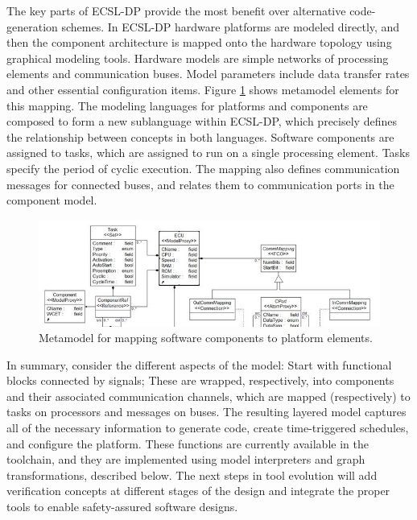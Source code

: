 The key parts of ECSL-DP provide the most benefit over alternative code-generation schemes.  In ECSL-DP hardware platforms are modeled directly, and then the component architecture is mapped onto the hardware topology using graphical modeling tools.   Hardware models are simple networks of processing elements and communication buses.  Model parameters include data transfer rates and other essential configuration items.  Figure \ref{fig:MappingMeta} shows metamodel elements for this mapping.  The modeling languages for platforms and components are composed to form a new sublanguage within ECSL-DP, which precisely defines the relationship between concepts in both languages.  Software components are assigned to tasks, which are assigned to run on a single processing element.  Tasks specify the period of cyclic execution.  The mapping also defines communication messages for connected buses, and relates them to communication ports in the component model.

\begin{figure}[h]
\begin{center}
   \includegraphics[width=0.9\columnwidth]{mapping_meta}
   \caption{Metamodel for mapping software components to platform elements.}
   \label{fig:MappingMeta}
\end{center}
\end{figure}
     
     In summary, consider the different aspects of the model:  Start with functional blocks connected by signals; These are wrapped, respectively, into components and their associated communication channels, which are mapped (respectively) to tasks on processors and messages on buses.  The resulting layered model captures all of the necessary information to generate code, create time-triggered schedules, and configure the platform.  These functions are currently available in the toolchain, and they are implemented using model interpreters and graph transformations, described below.  The next steps in tool evolution will add verification concepts at different stages of the design and integrate the proper tools to enable safety-assured software designs.
